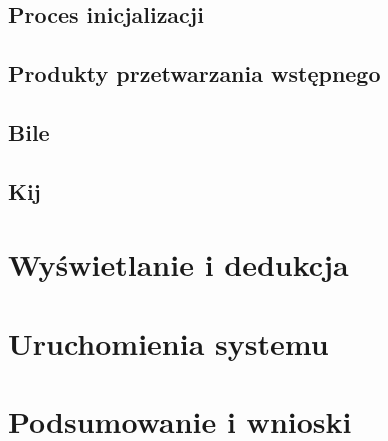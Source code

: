 \documentclass[12pt]{article}
\begin{document}
\subsection{Proces inicjalizacji}

\subsection{Produkty przetwarzania wstępnego}

\subsection{Bile}

\subsection{Kij}


\section{Wyświetlanie i dedukcja}
\section{Uruchomienia systemu}
\section{Podsumowanie i wnioski}
\newpage

\printbibliography
\end{document}
